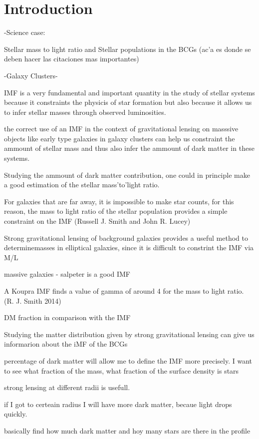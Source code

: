 \chapter{Introduction}

-Science case:

Stellar mass to light ratio and Stellar populations in the BCGs (ac'a es donde se deben hacer las citaciones mas importantes)

-Galaxy Clusters-

IMF is a very fundamental and important quantity in the study of stellar systems because it constraints the physicis of star formation but also because it allows us to infer stellar masses through observed luminosities.

the correct use of an IMF in the context of gravitational lensing on masssive objects like early type galaxies in galaxy clusters can help us constraint the ammount of stellar mass and thus also infer the ammount of dark matter in these systems.

Studying the ammount of dark matter contribution, one could in principle make a good estimation of the stellar mass'to'light ratio.

For galaxies that are far away, it is impossible to make star counts, for this reason, the mass to light ratio of the stellar population provides a simple constraint on the IMF (Russell J. Smith and John R. Lucey) 

Strong gravitational lensing of background galaxies provides a useful method to determinemasses in elliptical galaxies, since it is difficult to constrint the IMF via M/L

massive galaxies - salpeter is a good IMF

A Koupra IMF finds a value of gamma of around 4 for the mass to light ratio. (R. J. Smith 2014) 

DM fraction in comparison with the IMF 

Studying the matter distribution given by strong gravitational lensing can give us informarion about the iMF of the BCGs

percentage of dark matter will allow me to define the IMF more precisely. I want to see what fraction of the mass, what fraction of the surface density is stars

strong lensing at different radii is usefull.

if I got to certeain radius I will have more dark matter, becaue light drops quickly. 

basically find how much dark matter and hoy many stars are there in the profile


\newpage
